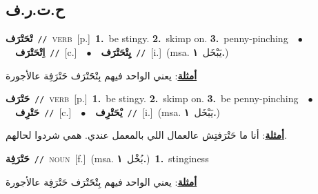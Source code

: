 \documentclass[10pt,a4paper,twoside]{article} %
\begin{document}
\begin{multicols}{2}
\vspace{-3mm}
\subsection*{\color{blue}\foreignlanguage{arabic}{ح.ت.ر.ف}\color{blue}{}} 

{\setlength\topsep{0pt}\textbf{\foreignlanguage{arabic}{تْحَتْرَف}}\ {\color{gray}\texttt{//}\color{black}}\ \textsc{verb}\ [p.]\ \textbf{1.}~be stingy.  \textbf{2.}~skimp on.  \textbf{3.}~penny-pinching\ \ $\bullet$\ \ \setlength\topsep{0pt}\textbf{\foreignlanguage{arabic}{اِتْحَتْرَف}}\ {\color{gray}\texttt{//}\color{black}}\ [c.]\ \ $\bullet$\ \ \setlength\topsep{0pt}\textbf{\foreignlanguage{arabic}{يِتْحَتْرَف}}\ {\color{gray}\texttt{//}\color{black}}\ [i.]\ \color{gray}(msa. \foreignlanguage{arabic}{يَبْخَل}~\foreignlanguage{arabic}{\textbf{١.}})\color{black}\  \begin{flushright}\color{gray}\foreignlanguage{arabic}{\textbf{\underline{\foreignlanguage{arabic}{أمثلة}}}: يعني الواحد فيهم بِتْحََتْرَف حَتْرَفِة عالأجورة}\end{flushright}\color{black}} \vspace{2mm}

{\setlength\topsep{0pt}\textbf{\foreignlanguage{arabic}{حَتْرَف}}\ {\color{gray}\texttt{//}\color{black}}\ \textsc{verb}\ [p.]\ \textbf{1.}~be stingy.  \textbf{2.}~skimp on.  \textbf{3.}~be penny-pinching\ \ $\bullet$\ \ \setlength\topsep{0pt}\textbf{\foreignlanguage{arabic}{حَتْرِف}}\ {\color{gray}\texttt{//}\color{black}}\ [c.]\ \ $\bullet$\ \ \setlength\topsep{0pt}\textbf{\foreignlanguage{arabic}{يْحَتْرِف}}\ {\color{gray}\texttt{//}\color{black}}\ [i.]\ \color{gray}(msa. \foreignlanguage{arabic}{يَبْخَل}~\foreignlanguage{arabic}{\textbf{١.}})\color{black}\  \begin{flushright}\color{gray}\foreignlanguage{arabic}{\textbf{\underline{\foreignlanguage{arabic}{أمثلة}}}: أنا ما حَتْرَفتِش عالعمال اللي بالمعمل عندي. همي شردوا لحالهم.}\end{flushright}\color{black}} \vspace{2mm}

{\setlength\topsep{0pt}\textbf{\foreignlanguage{arabic}{حَتْرَفِة}}\ {\color{gray}\texttt{//}\color{black}}\ \textsc{noun}\ [f.]\ \color{gray}(msa. \foreignlanguage{arabic}{بُخْل}~\foreignlanguage{arabic}{\textbf{١.}})\color{black}\ \textbf{1.}~stinginess\  \begin{flushright}\color{gray}\foreignlanguage{arabic}{\textbf{\underline{\foreignlanguage{arabic}{أمثلة}}}: يعني الواحد فيهم بِتْحََتْرَف حَتْرَفِة عالأجورة}\end{flushright}\color{black}} \vspace{2mm}


\end{multicols}
\end{document}
